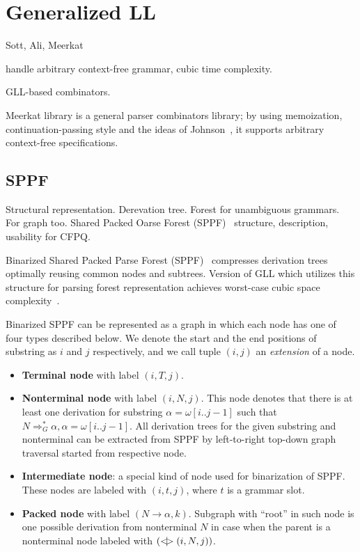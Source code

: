\section{Generalized LL}

Sott, Ali, Meerkat

handle arbitrary context-free grammar, cubic time complexity.

GLL-based combinators.

Meerkat library is a general parser combinators library; by using memoization, continuation-passing style and the ideas of Johnson~\cite{Johnson}, it supports arbitrary context-free specifications. 


\subsection{SPPF}

Structural representation. 
Derevation tree.
Forest for unambiguous grammars.
For graph too.
Shared Packed Oarse Forest (SPPF)~\cite{SPPF} structure, description, usability for CFPQ.

Binarized Shared Packed Parse Forest (SPPF)~\cite{brnglr} compresses derivation trees optimally reusing common nodes and subtrees.
Version of GLL which utilizes this structure for parsing forest representation achieves worst-case cubic space complexity~\cite{gllParsingTree}.

Binarized SPPF can be represented as a graph in which each node has one of four types described below.
We denote the start and the end positions of substring as $i$ and $j$ respectively, and we call tuple $(i,j)$ an \textit{extension} of a node.

\begin{itemize}
    \item \textbf{Terminal node} with label $(i, T, j)$.
    \item \textbf{Nonterminal node} with label $(i, N, j)$. 
    This node denotes that there is at least one derivation for substring $\alpha=\omega[i..j-1]$ such that $N \Rightarrow^*_G \alpha, \alpha = \omega[i..j-1] $.
    All derivation trees for the given substring and nonterminal can be extracted from SPPF by left-to-right top-down graph traversal started from respective node.     
    \item \textbf{Intermediate node}: a special kind of node used for binarization of SPPF. These nodes are labeled with $(i,t,j)$, where $t$ is a grammar slot.
    \item \textbf{Packed node} with label $(N \rightarrow \alpha, k)$. 
    Subgraph with ``root'' in such node is one possible derivation from nonterminal $N$ in case when the parent is a nonterminal node labeled with $(<\mkern-9mu | \mkern-9mu> (i, N, j))$.

\end{itemize}

